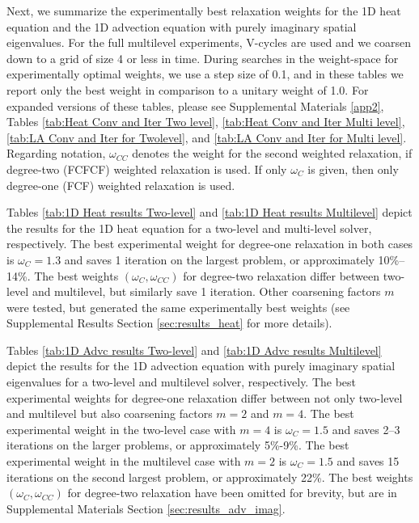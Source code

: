 \documentclass[VANCOUVER,STIX1COL]{WileyNJD-v2}
\makeatletter
\newcommand{\JS}[1]{\textcolor{blue}{[JS\@: #1]}}
\makeatother
\begin{document}
Next, we summarize the experimentally best relaxation weights for the 1D heat equation and the 1D advection equation with purely imaginary spatial eigenvalues. 
For the full multilevel experiments, V-cycles are used and we coarsen down to a grid of size 4 or less in time.  During searches in the weight-space for experimentally optimal weights, we use a step size of 0.1, and in these tables we report only the best weight in comparison to a unitary weight of 1.0.  For expanded versions of these tables, please see Supplemental Materials \ref{app2}, 
Tables \ref{tab:Heat Conv and Iter Two level}, \ref{tab:Heat Conv and Iter Multi level}, \ref{tab:LA Conv and Iter for Twolevel}, and \ref{tab:LA Conv and Iter for Multi level}.   Regarding notation, $\omega_{CC}$ denotes the weight for the second weighted
relaxation, if degree-two (FCFCF) weighted relaxation is used.  If only
$\omega_C$ is given, then only degree-one (FCF) weighted relaxation is used. 

Tables \ref{tab:1D Heat results Two-level} and \ref{tab:1D Heat results Multilevel} depict the results for the 1D heat equation for a two-level and multi-level solver, respectively.  The best experimental weight for degree-one relaxation in both cases is $\omega_C=1.3$ and saves 1 iteration on the largest problem, or approximately 10\%--14\%.  The best weights $(\omega_C,\omega_{CC})$ for degree-two relaxation differ between two-level and multilevel, but similarly save 1 iteration. Other coarsening factors $m$ were tested, but generated the same experimentally best weights (see Supplemental Results Section  \ref{sec:results_heat} for more details).

Tables \ref{tab:1D Advc results Two-level} and \ref{tab:1D Advc results Multilevel} depict the results for the 1D advection equation with purely imaginary spatial eigenvalues for a two-level and multilevel solver, respectively. The best experimental weights for degree-one relaxation differ between not only two-level and multilevel but also coarsening factors $m=2$ and $m=4$. The best experimental weight in the two-level case with $m=4$ is $\omega_C=1.5$ and saves 2--3 iterations on the larger problems, or approximately 5\%-9\%. The best experimental weight in the multilevel case with $m=2$ is $\omega_C=1.5$ and saves 15 iterations on the second largest problem, or approximately 22\%.  The best weights $(\omega_C,\omega_{CC})$ for degree-two relaxation have been omitted for brevity, but are in Supplemental Materials Section \ref{sec:results_adv_imag}.
\end{document}
